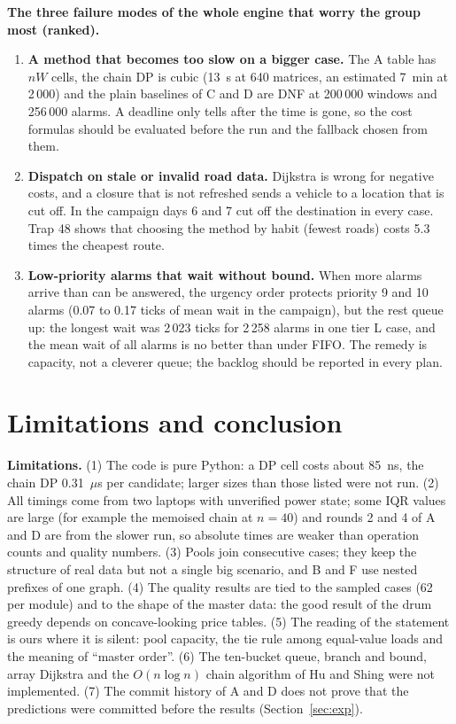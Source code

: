 \documentclass[11pt,a4paper]{article}
\begin{document}
\textbf{The three failure modes of the whole engine that worry the group most (ranked).}
\begin{enumerate}
\item \textbf{A method that becomes too slow on a bigger case.} The A table has $nW$ cells, the chain DP is cubic (13~s at 640 matrices, an estimated 7~min at 2\,000) and the plain baselines of C and D are DNF at 200\,000 windows and 256\,000 alarms.
A deadline only tells after the time is gone, so the cost formulas should be evaluated before the run and the fallback chosen from them.
\item \textbf{Dispatch on stale or invalid road data.} Dijkstra is wrong for negative costs, and a closure that is not refreshed sends a vehicle to a location that is cut off. In the campaign days 6 and 7 cut off the destination in every case. Trap 48 shows that choosing the method by habit (fewest roads) costs 5.3 times the cheapest route.
\item \textbf{Low-priority alarms that wait without bound.} When more alarms arrive than can be answered, the urgency order protects priority 9 and 10 alarms (0.07 to 0.17 ticks of mean wait in the campaign), but the rest queue up: the longest wait was 2\,023 ticks for 2\,258 alarms in one tier L case, and the mean wait of all alarms is no better than under FIFO.
The remedy is capacity, not a cleverer queue; the backlog should be reported in every plan.
\end{enumerate}

\section{Limitations and conclusion}\label{sec:limits}
\textbf{Limitations.} (1) The code is pure Python: a DP cell costs about 85~ns, the chain DP 0.31~$\mu$s per candidate; larger sizes than those listed were not run. (2) All timings come from two laptops with unverified power state; some IQR values are large (for example the memoised chain at $n=40$)
and rounds 2 and 4 of A and D are from the slower run, so absolute times are weaker than operation counts and quality numbers. (3) Pools join consecutive cases; they keep the structure of real data but not a single big scenario, and B and F use nested prefixes of one graph.
(4) The quality results are tied to the sampled cases (62 per module) and to the shape of the master data: the good result of the drum greedy depends on concave-looking price tables. (5) The reading of the statement is ours where it is silent: pool capacity, the tie rule among equal-value loads and the meaning of ``master order''.
(6) The ten-bucket queue, branch and bound, array Dijkstra and the $O(n\log n)$ chain algorithm of Hu and Shing were not implemented. (7) The commit history of A and D does not prove that the predictions were committed before the results (Section~\ref{sec:exp}).
\end{document}
